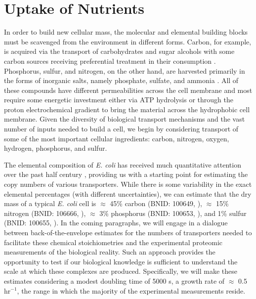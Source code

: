 \section{Uptake of Nutrients}
In order to build new cellular mass, the molecular and elemental building blocks
must be scavenged from the environment in different forms. Carbon, for example,
is acquired via the transport of carbohydrates and sugar alcohols with some
carbon sources receiving preferential treatment in their consumption
\citep{monod1947}. Phosphorus, sulfur, and nitrogen, on the other hand, are
harvested primarily in the forms of inorganic salts, namely phosphate, sulfate,
and ammonia \citep{jun2018, assentoft2016, stasi2019, antonenko1997,
rosenberg1977, willsky1973}. All of these compounds have different
permeabilities across the cell membrane \cite{phillips2018} and  most require some energetic
investment either via ATP hydrolysis or through the proton electrochemical
gradient to bring the material across the hydrophobic cell membrane. Given the
diversity of biological transport mechanisms and the vast number of inputs
needed to build a cell, we begin by considering transport of some of the most
important cellular ingredients: carbon, nitrogen, oxygen, hydrogen, phosphorus,
and sulfur.

The elemental composition of \textit{E. coli} has received much quantitative
attention over the past half century \citep{neidhardt1991, taymaz-nikerel2010,
heldal1985, bauer1976}, providing us with a starting point for estimating the
copy numbers of various transporters. While there is some variability in the
exact elemental percentages (with different uncertainties), we can estimate that
the dry mass of a typical \textit{E. coli} cell is $\approx$ 45\% carbon (BNID:
100649, \cite{milo2010}), $\approx$ 15\% nitrogen (BNID: 106666,
\cite{milo2010}), $\approx$ 3\% phosphorus (BNID: 100653, \cite{milo2010}), and
1\% sulfur (BNID: 100655, \cite{milo2010}). In the coming paragraphs, we will
engage in a dialogue between back-of-the-envelope estimates for the numbers of
transporters needed to facilitate these chemical stoichiometries and the
experimental proteomic measurements of the biological reality. Such an approach
provides the opportunity to test if our biological knowledge is sufficient to
understand the scale at which these complexes are produced. Specifically, we
will make these estimates considering a modest doubling time of 5000 s, a growth
rate of $\approx$ 0.5 hr$^{-1}$, the range in which the majority of the
experimental measurements reside.

